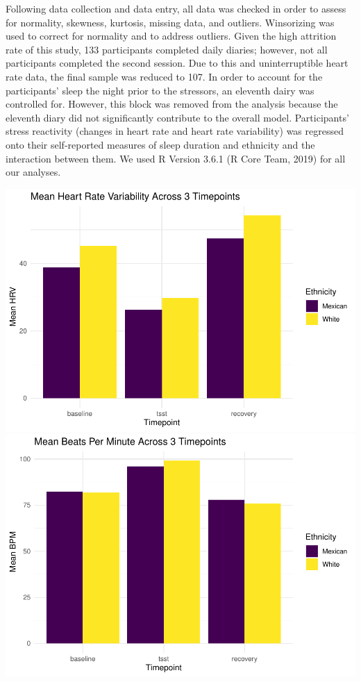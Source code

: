 \documentclass[man, fleqn, noextraspace]{apa6}
\begin{document}
Following data collection and data entry, all data was checked in order to assess for normality, skewness, kurtosis, missing data, and outliers. Winsorizing was used to correct for normality and to address outliers. Given the high attrition rate of this study, 133 participants completed daily diaries; however, not all participants completed the second session. Due to this and uninterruptible heart rate data, the final sample was reduced to 107. In order to account for the participants' sleep the night prior to the stressors, an eleventh dairy was controlled for. However, this block was removed from the analysis because the eleventh diary did not significantly contribute to the overall model. Participants' stress reactivity (changes in heart rate and heart rate variability) was regressed onto their self-reported measures of sleep duration and ethnicity and the interaction between them. We used R Version 3.6.1 (R Core Team, 2019) for all our analyses.

\includegraphics{PAPAJA_Final_class_project_files/figure-latex/visualization-1.pdf} \includegraphics{PAPAJA_Final_class_project_files/figure-latex/visualization-2.pdf}
\end{document}
